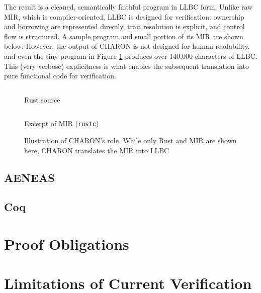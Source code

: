 The result is a cleaned, semantically faithful program in LLBC form. Unlike raw
MIR, which is compiler-oriented, LLBC is designed for verification: ownership
and borrowing are represented directly, trait resolution is explicit, and
control flow is structured. A sample program and small portion of its MIR are shown below. However, the output of CHARON is not designed for human readability, and even the tiny program in Figure \ref{fig:charon_translation} produces over 140,000 characters of LLBC. This (very verbose) explicitness is what enables the subsequent translation into pure functional code for verification.

\begin{figure}[ht]
  \centering
  \begin{minipage}[t]{0.45\linewidth}
    \inputminted[linenos, breaklines, frame=none, fontsize=\footnotesize]{rust}{3_Chapter3/CHARON_example/rust.rs}
    \vfill
    \caption*{Rust source}
  \end{minipage}
  \hfill
  \begin{minipage}[t]{0.45\linewidth}
    \inputminted[linenos, breaklines, frame=none, fontsize=\footnotesize]{text}{3_Chapter3/CHARON_example/mir.txt}
    \vfill
    \caption*{Excerpt of MIR (\texttt{rustc})}
  \end{minipage}
  \caption{Illustration of CHARON’s role. While only Rust and MIR are shown here, CHARON translates the MIR into LLBC}
  \label{fig:charon_translation}
\end{figure}

\subsection{AENEAS}

\subsection{Coq}

\section{Proof Obligations}
\label{sec:proof_obligations}

\section{Limitations of Current Verification}
\label{sec:limitations_verification}